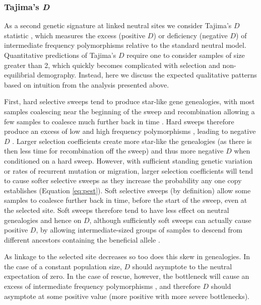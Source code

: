 \documentclass[]{article}
\begin{document}
\subsubsection*{Tajima's \textit{D}}
\label{sec:tajimasD}

As a second genetic signature at linked neutral sites we consider Tajima's $D$ statistic \citep{tajima1989statistical}, which measures the excess (positive $D$) or deficiency (negative $D$) of intermediate frequency polymorphisms relative to the standard neutral model. 
Quantitative predictions of Tajima's $D$ require one to consider samples of size greater than 2, which quickly becomes complicated with selection and non-equilibrial demography.
Instead, here we discuss the expected qualitative patterns based on intuition from the analysis presented above.

First, hard selective sweeps tend to produce star-like gene genealogies, with most samples coalescing near the beginning of the sweep and recombination allowing a few samples to coalesce much further back in time \citep{kaplan1989hitchhiking}.
Hard sweeps therefore produce an excess of low and high frequency polymorphisms \citep[][p.\ 120]{wakeley2009coalescent}, leading to negative $D$ \citep{braverman1995hitchhiking}.
Larger selection coefficients create more star-like the genealogies (as there is then less time for recombination off the sweep) and thus more negative $D$ when conditioned on a hard sweep.
However, with sufficient standing genetic variation or rates of recurrent mutation or migration, larger selection coefficients will tend to cause softer selective sweeps as they increase the probability any one copy establishes (Equation \ref{eq:pest}).
Soft selective sweeps (by definition) allow some samples to coalesce further back in time, before the start of the sweep, even at the selected site.
Soft sweeps therefore tend to have less effect on neutral genealogies and hence on $D$, although sufficiently soft sweeps can actually cause positive $D$, by allowing intermediate-sized groups of samples to descend from different ancestors containing the beneficial allele \citep{pennings2006soft}.

As linkage to the selected site decreases so too does this skew in genealogies.
In the case of a constant population size, $D$ should asymptote to the neutral expectation of zero.
In the case of rescue, however, the bottleneck will cause an excess of intermediate frequency polymorphisms \citep[][p.\ 120]{wakeley2009coalescent}, and therefore $D$ should asymptote at some positive value (more positive with more severe bottlenecks).
\end{document}
